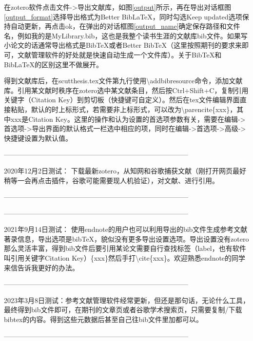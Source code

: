 在zotero软件点击文件->导出文献库，如图\ref{output}所示，再在导出对话框图\ref{output_format}选择导出格式为Better BibLaTeX，同时勾选Keep updated选项保持自动更新，再点击ok，在弹出的对话框图\ref{output_name}确定保存路径和文件名，例如我的是MyLibrary.bib，这也是我整个读书生涯的文献库bib文件。如果写小论文的话通常导出格式是BibTeX或者Better BibTeX（这里按照期刊的要求来即可，文献管理软件的好处就是快速自动生成一个文件库）。关于BibTeX和BibLaTeX的区别这里不做展开。

得到文献库后，在scutthesis.tex文件第九行使用\textbackslash{}addbibresource命令，添加文献库。引用某文献时秩序在zotero选中某文献条目，然后按Ctrl+Shift+C，复制引用关键字（Citation Key）到剪切板（快捷键可自定义）。然后在tex文件编辑界面直接粘贴，默认的时上标形式，若需要非上标形式，可以改为\textbackslash{}parencite\{xxx\}，其中xxx是Citation Key。这里的操作和认为设置的首选项参数有关，需要在编辑->首选项->导出界面的默认格式一栏选中相应的项，同时在编辑->首选项->高级->快捷键设置为默认值。

---------------------------------------------------------------------------------

2020年12月2日测试：
下载最新zotero，从知网和谷歌捕获文献（刚打开网页最好稍等一会再点击插件，谷歌可能需要现人机验证），对文献\parencite{Renduchintala_2019}、\parencite{milz2020design}进行引用。

---------------------------------------------------------------------------------

---------------------------------------------------------------------------------

2021年9月14日测试：
使用endnote的用户也可以利用导出的bib文件生成参考文献著录信息，导出选项是bibTeX，貌似没有更多导出设置选项。导出设置没有zotero那么灵活丰富，得到bib文件后要引用某论文需要自行查找标签（label，也有软件叫引用关键字Citation Key）\{xxx\}然后手打\textbackslash{}cite\{xxx\}。欢迎熟悉endnote的同学来信告诉我更好的办法。

---------------------------------------------------------------------------------

2023年3月8日测试：参考文献管理软件经常更新，但还是那句话，无论什么工具，最终得到bib文件即可，在期刊的文章页或者谷歌学术搜索页，只需要复制/下载bibtex的内容。得到这些元数据后甚至自己往bib文件里加都可以。

---------------------------------------------------------------------------------

